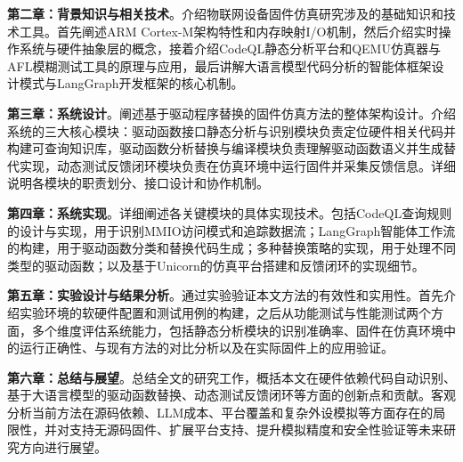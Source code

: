 \textbf{第二章：背景知识与相关技术}。介绍物联网设备固件仿真研究涉及的基础知识和技术工具。首先阐述ARM Cortex-M架构特性和内存映射I/O机制，然后介绍实时操作系统与硬件抽象层的概念，接着介绍CodeQL静态分析平台和QEMU仿真器与AFL模糊测试工具的原理与应用，最后讲解大语言模型代码分析的智能体框架设计模式与LangGraph开发框架的核心机制。

\textbf{第三章：系统设计}。阐述基于驱动程序替换的固件仿真方法的整体架构设计。介绍系统的三大核心模块：驱动函数接口静态分析与识别模块负责定位硬件相关代码并构建可查询知识库，驱动函数分析替换与编译模块负责理解驱动函数语义并生成替代实现，动态测试反馈闭环模块负责在仿真环境中运行固件并采集反馈信息。详细说明各模块的职责划分、接口设计和协作机制。

\textbf{第四章：系统实现}。详细阐述各关键模块的具体实现技术。包括CodeQL查询规则的设计与实现，用于识别MMIO访问模式和追踪数据流；LangGraph智能体工作流的构建，用于驱动函数分类和替换代码生成；多种替换策略的实现，用于处理不同类型的驱动函数；以及基于Unicorn的仿真平台搭建和反馈闭环的实现细节。

\textbf{第五章：实验设计与结果分析}。通过实验验证本文方法的有效性和实用性。首先介绍实验环境的软硬件配置和测试用例的构建，之后从功能测试与性能测试两个方面，多个维度评估系统能力，包括静态分析模块的识别准确率、固件在仿真环境中的运行正确性、与现有方法的对比分析以及在实际固件上的应用验证。

\textbf{第六章：总结与展望}。总结全文的研究工作，概括本文在硬件依赖代码自动识别、基于大语言模型的驱动函数替换、动态测试反馈闭环等方面的创新点和贡献。客观分析当前方法在源码依赖、LLM成本、平台覆盖和复杂外设模拟等方面存在的局限性，并对支持无源码固件、扩展平台支持、提升模拟精度和安全性验证等未来研究方向进行展望。
